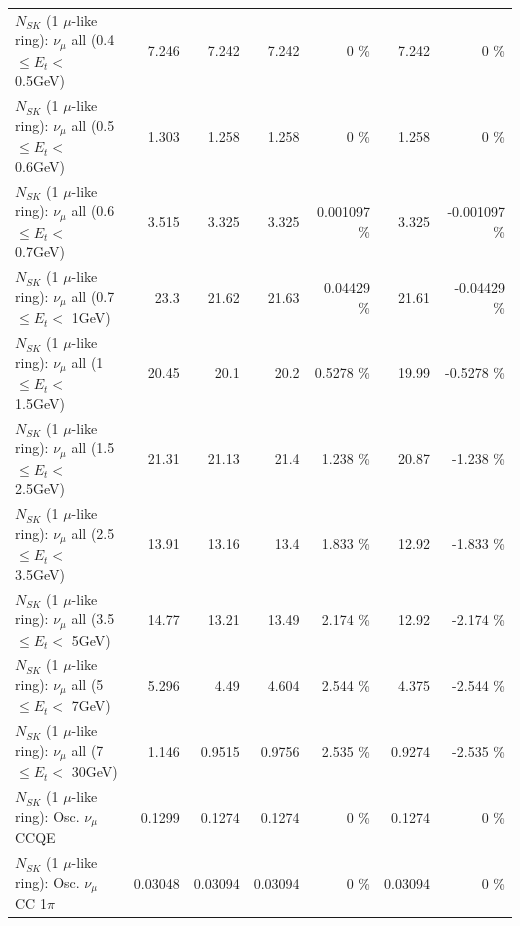 \begin{table}
\begin{tabular}{| l | r | r | r  r | r  r |}
       $N_{SK}$ (1 $\mu$-like ring): $\nu_{\mu}$ all (0.4 $\leq E_{t} <$ 0.5GeV) &           7.246 &           7.242 &           7.242 &        0 \%  &           7.242 &        0 \%  \\ 
       $N_{SK}$ (1 $\mu$-like ring): $\nu_{\mu}$ all (0.5 $\leq E_{t} <$ 0.6GeV) &           1.303 &           1.258 &           1.258 &        0 \%  &           1.258 &        0 \%  \\ 
       $N_{SK}$ (1 $\mu$-like ring): $\nu_{\mu}$ all (0.6 $\leq E_{t} <$ 0.7GeV) &           3.515 &           3.325 &           3.325 & 0.001097 \%  &           3.325 & -0.001097 \%  \\ 
         $N_{SK}$ (1 $\mu$-like ring): $\nu_{\mu}$ all (0.7 $\leq E_{t} <$ 1GeV) &            23.3 &           21.62 &           21.63 &  0.04429 \%  &           21.61 & -0.04429 \%  \\ 
         $N_{SK}$ (1 $\mu$-like ring): $\nu_{\mu}$ all (1 $\leq E_{t} <$ 1.5GeV) &           20.45 &            20.1 &            20.2 &   0.5278 \%  &           19.99 &  -0.5278 \%  \\ 
       $N_{SK}$ (1 $\mu$-like ring): $\nu_{\mu}$ all (1.5 $\leq E_{t} <$ 2.5GeV) &           21.31 &           21.13 &            21.4 &    1.238 \%  &           20.87 &   -1.238 \%  \\ 
       $N_{SK}$ (1 $\mu$-like ring): $\nu_{\mu}$ all (2.5 $\leq E_{t} <$ 3.5GeV) &           13.91 &           13.16 &            13.4 &    1.833 \%  &           12.92 &   -1.833 \%  \\ 
         $N_{SK}$ (1 $\mu$-like ring): $\nu_{\mu}$ all (3.5 $\leq E_{t} <$ 5GeV) &           14.77 &           13.21 &           13.49 &    2.174 \%  &           12.92 &   -2.174 \%  \\ 
           $N_{SK}$ (1 $\mu$-like ring): $\nu_{\mu}$ all (5 $\leq E_{t} <$ 7GeV) &           5.296 &            4.49 &           4.604 &    2.544 \%  &           4.375 &   -2.544 \%  \\ 
          $N_{SK}$ (1 $\mu$-like ring): $\nu_{\mu}$ all (7 $\leq E_{t} <$ 30GeV) &           1.146 &          0.9515 &          0.9756 &    2.535 \%  &          0.9274 &   -2.535 \%  \\ 
\hline
\hline
                               $N_{SK}$ (1 $\mu$-like ring): Osc. $\nu_\mu$ CCQE &          0.1299 &          0.1274 &          0.1274 &        0 \%  &          0.1274 &        0 \%  \\ 
                          $N_{SK}$ (1 $\mu$-like ring): Osc. $\nu_\mu$ CC 1$\pi$ &         0.03048 &         0.03094 &         0.03094 &        0 \%  &         0.03094 &        0 \%  \\ 

\end{tabular}
\end{table}
